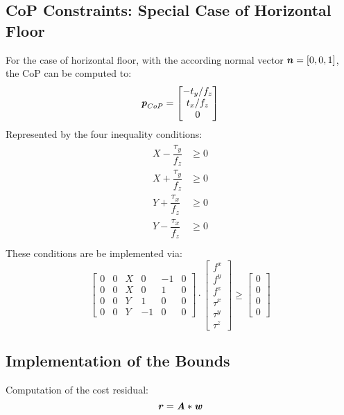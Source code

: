 \subsection{CoP Constraints: Special Case of Horizontal Floor}
For the case of horizontal floor, with the according normal vector $\bm{\mathit{n}}=[0,0,1]$, the \gls{CoP} can be computed to: 
\begin{equation}
\bm{\mathit{p}}_{CoP} = \begin{bmatrix} -t_y/f_z \\ t_x/f_z \\ 0 \end{bmatrix}
\end{equation}
Represented by the four inequality conditions:
\begin{align}
\begin{split}
X-\dfrac{\tau_y}{f_z} &\geq 0 \\
X+\dfrac{\tau_y}{f_z} &\geq 0 \\
Y+\dfrac{\tau_x}{f_z} &\geq 0 \\
Y-\dfrac{\tau_x}{f_z} &\geq 0 \\
\end{split}
\end{align}
These conditions are be implemented via: 
\begin{equation}
\begin{bmatrix} 
0 & 0 & X & 0 & -1 & 0 \\
0 & 0 & X & 0 & 1 & 0 \\
0 & 0 & Y & 1 & 0 & 0 \\
0 & 0 & Y & -1 & 0 & 0 \end{bmatrix} \cdot
\begin{bmatrix} f^x \\ f^y \\ f^z \\ \tau^x \\ \tau^y \\ \tau^z \end{bmatrix} \geq
\begin{bmatrix} 0 \\ 0 \\ 0 \\ 0 \end{bmatrix}
\end{equation}

\subsection{Implementation of the Bounds}
Computation of the cost residual: 
\begin{equation}
\bm{\mathit{r}} = \bm{\mathit{A}} * \bm{\mathit{w}}
\end{equation}

